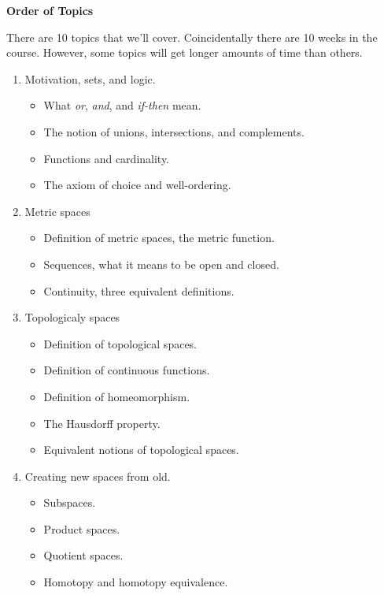\documentclass{article}
\begin{document}
    \textbf{Order of Topics}
    \par\hfill\par
    There are 10 topics that we'll cover. Coincidentally there are 10 weeks in
    the course. However, some topics will get longer amounts of time than
    others.
    \begin{enumerate}
        \item Motivation, sets, and logic.
            \begin{itemize}
                \item What \textit{or}, \textit{and}, and \textit{if-then} mean.
                \item The notion of unions, intersections, and complements.
                \item Functions and cardinality.
                \item The axiom of choice and well-ordering.
            \end{itemize}
        \item Metric spaces
            \begin{itemize}
                \item Definition of metric spaces, the metric function.
                \item Sequences, what it means to be open and closed.
                \item Continuity, three equivalent definitions.
            \end{itemize}
        \item Topologicaly spaces
            \begin{itemize}
                \item Definition of topological spaces.
                \item Definition of continuous functions.
                \item Definition of homeomorphism.
                \item The Hausdorff property.
                \item Equivalent notions of topological spaces.
            \end{itemize}
        \item Creating new spaces from old.
            \begin{itemize}
                \item Subspaces.
                \item Product spaces.
                \item Quotient spaces.
                \item Homotopy and homotopy equivalence.

\end{itemize}
\end{enumerate}
\end{document}
